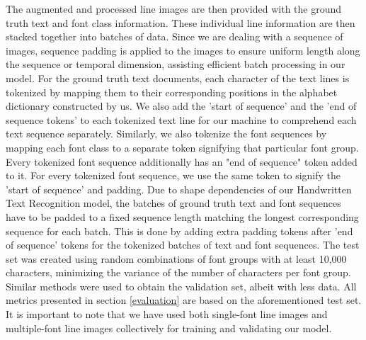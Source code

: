 \documentclass[conference]{IEEEtran}
\begin{document}
The augmented and processed line images are then provided with the ground truth text and font class information. These individual line information are then stacked together into batches of data. Since we are dealing with a sequence of images, sequence padding is applied to the images to ensure uniform length along the sequence or temporal dimension, assisting efficient batch processing in our model. For the ground truth text documents, each character of the text lines is tokenized by mapping them to their corresponding positions in the alphabet dictionary constructed by us. We also add the 'start of sequence' and the 'end of sequence tokens' to each tokenized text line for our machine to comprehend each text sequence separately. Similarly, we also tokenize the font sequences by mapping each font class to a separate token signifying that particular font group. Every tokenized font sequence additionally has an "end of sequence" token added to it. For every tokenized font sequence, we use the same token to signify the 'start of sequence' and padding.  Due to shape dependencies of our Handwritten Text Recognition model, the batches of ground truth text and font sequences have to be padded to a fixed sequence length matching the longest corresponding sequence for each batch. This is done by adding extra padding tokens after 'end of sequence' tokens for the tokenized batches of text and font sequences.\newline
The test set was created using random combinations of font groups with at least 10,000 characters, minimizing the variance of the number of characters per font group. Similar methods were used to obtain the validation set, albeit with less data. All metrics presented in section \ref{evaluation} are based on the aforementioned test set. It is important to note that we have used both single-font line images and multiple-font line images collectively for training and validating our model.
\end{document}
